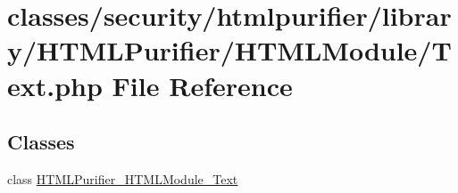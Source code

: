 \hypertarget{HTMLModule_2Text_8php}{\section{classes/security/htmlpurifier/library/\+H\+T\+M\+L\+Purifier/\+H\+T\+M\+L\+Module/\+Text.php File Reference}
\label{HTMLModule_2Text_8php}
}
\subsection*{Classes}
\begin{DoxyCompactItemize}
\item 
class \hyperlink{classHTMLPurifier__HTMLModule__Text}{H\+T\+M\+L\+Purifier\+\_\+\+H\+T\+M\+L\+Module\+\_\+\+Text}
\end{DoxyCompactItemize}
